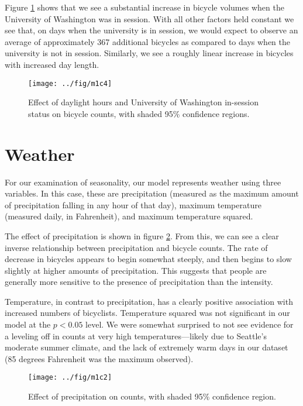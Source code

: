 \documentclass[12pt,letterpaper,article]{memoir}
\begin{document}
Figure \ref{fg:seasonality} shows that we see a substantial increase
in bicycle volumes when the University of Washington was in session.
With all other factors held constant we see that, on days when the
university is in session, we would expect to observe an average of
approximately 367 additional bicycles as compared to days when the
university is not in session. Similarly, we see a roughly linear
increase in bicycles with increased day length.

\begin{figure}[htbp!]
  \centering
  \texttt{[image: ../fig/m1c4]}
  \caption{Effect of daylight hours and University of Washington
    in-session status on bicycle counts, with shaded 95\% confidence
    regions.}
  \label{fg:seasonality}
\end{figure}

\FloatBarrier
\section*{Weather}
For our examination of seasonality, our model represents weather using
three variables. In this case, these are precipitation (measured as
the maximum amount of precipitation falling in any hour of that day),
maximum temperature (measured daily, in Fahrenheit), and maximum
temperature squared.

The effect of precipitation is shown in figure \ref{fg:precipitation}.
From this, we can see a clear inverse relationship between
precipitation and bicycle counts. The rate of decrease in bicycles
appears to begin somewhat steeply, and then begins to slow slightly at
higher amounts of precipitation. This suggests that people are
generally more sensitive to the presence of precipitation than the
intensity.

Temperature, in contrast to precipitation, has a clearly positive
association with increased numbers of bicyclists. Temperature squared
was not significant in our model at the $p < 0.05$ level. We were
somewhat surprised to not see evidence for a leveling off in counts at
very high temperatures---likely due to Seattle's moderate summer
climate, and the lack of extremely warm days in our dataset (85
degrees Fahrenheit was the maximum observed).

\begin{figure}[ht!]
  \centering
  \texttt{[image: ../fig/m1c2]}
  \caption{Effect of precipitation on counts, with shaded 95\%
    confidence region.}
  \label{fg:precipitation}
\end{figure}
\end{document}
